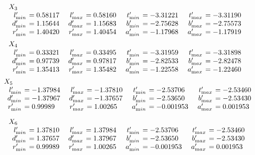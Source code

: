 \begin{table}
\begin{small}
$$
\begin{array}{rlrlrlrl}
\noalign{\noindent 
$X_3$}
\noalign{\vskip2pt} l'_{\textrm min} &\hskip-6pt =   0.58117&\enspace   l'_{\textrm max} &\hskip-6pt =   0.58160&\enspace  
t'_{\textrm min} &\hskip-6pt =   -3.31221&\enspace   t'_{\textrm max} &\hskip-6pt =   -3.31190\\
d'_{\textrm min} &\hskip-6pt =   1.15644& d'_{\textrm max}
&\hskip-6pt =   1.15683&  b'_{\textrm min} &\hskip-6pt =   -2.75628& b'_{\textrm max} &\hskip-6pt =   -2.75573\\
r'_{\textrm min} &\hskip-6pt =   1.40420&
r'_{\textrm max} &\hskip-6pt =   1.40454&  a'_{\textrm min} &\hskip-6pt =   -1.17968& a'_{\textrm max} &\hskip-6pt =   -1.17919
\end{array}
$$
$$
\begin{array}{rlrlrlrl}
\noalign{\noindent 
$X_4$}
\noalign{\vskip2pt}
l'_{\textrm min} &\hskip-6pt = 0.33321&\enspace   l'_{\textrm max} &\hskip-6pt = 0.33495&\enspace  
t'_{\textrm min} &\hskip-6pt = -3.31959&\enspace   t'_{\textrm max}&\hskip-6pt = -3.31898\\
d'_{\textrm min} &\hskip-6pt = 0.97739& d'_{\textrm max}
&\hskip-6pt = 0.97817&  b'_{\textrm min} &\hskip-6pt = -2.82533& b'_{\textrm max} &\hskip-6pt = -2.82478\\
r'_{\textrm min} &\hskip-6pt = 1.35413&
r'_{\textrm max} &\hskip-6pt = 1.35482&  a'_{\textrm min} &\hskip-6pt = -1.22558& a'_{\textrm max} &\hskip-6pt = -1.22460\end{array}$$
$$\begin{array}{rlrlrlrl}
\noalign{\noindent 
$X_5$}
\noalign{\vskip2pt}
l'_{\textrm min} &\hskip-6pt = -1.37984&\enspace   l'_{\textrm max}&\hskip-6pt = -1.37810&\enspace  
t'_{\textrm min} &\hskip-6pt = -2.53706&\enspace   t'_{\textrm max} &\hskip-6pt = -2.53460\\
d'_{\textrm min} &\hskip-6pt = -1.37967& d'_{\textrm max}
&\hskip-6pt = -1.37657&  b'_{\textrm min}&\hskip-6pt = -2.53650& b'_{\textrm max} &\hskip-6pt = -2.53430\\
r'_{\textrm min} &\hskip-6pt = 0.99989&
r'_{\textrm max} &\hskip-6pt = 1.00265&  a'_{\textrm min} &\hskip-6pt = -0.001953& a'_{\textrm max} &\hskip-6pt = 0.001953\end{array}$$

$$\begin{array}{rlrlrlrl}
\noalign{\noindent 
$X_6$}
\noalign{\vskip2pt}
l'_{\textrm min} &\hskip-6pt = 1.37810&\enspace   l'_{\textrm max}&\hskip-6pt = 1.37984&\enspace  
t'_{\textrm min} &\hskip-6pt = -2.53706&\enspace   t'_{\textrm max} &\hskip-6pt = -2.53460\\
d'_{\textrm min} &\hskip-6pt = 1.37657& d'_{\textrm max}
&\hskip-6pt = 1.37967& b'_{\textrm min} &\hskip-6pt = -2.53650& b'_{\textrm max}&\hskip-6pt = -2.53430\\
r'_{\textrm min} &\hskip-6pt = 0.99989&
r'_{\textrm max} &\hskip-6pt = 1.00265&  a'_{\textrm min} &\hskip-6pt = -0.001953& a'_{\textrm max} &\hskip-6pt = 0.001953
\end{array}$$
\end{small}
 \end{table}

